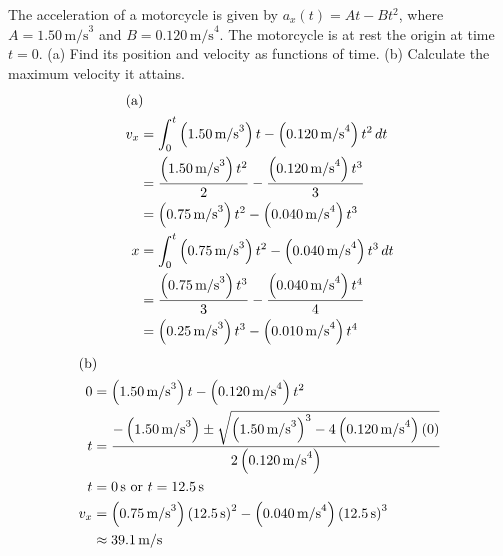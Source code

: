 \documentclass[12pt]{article}
\newenvironment{problem}[2][]{
    \begin{trivlist}
        \item[
            {\bfseries #1}
            {\bfseries #2}
        ]
}{\end{trivlist}}
\newcommand{\Part}[1]{\shortintertext{(#1)}}
\newcommand{\unit}[1]{\, \text{#1}}
\newcommand{\mps}{\unit{m/s}}
\newcommand{\s}{\unit{s}}
\begin{document}
\begin{problem}{2.53}
    The acceleration of a motorcycle is given by $a_x(t) = At - Bt^2$, where $A = 1.50 \mps^3$ and $B = 0.120 \mps^4$.
    The motorcycle is at rest the origin at time $t = 0$.
    (a) Find its position and velocity as functions of time.
    (b) Calculate the maximum velocity it attains.
    \begin{align}
        \Part{a}
        v_x &= \int_0^t \left(1.50 \mps^3\right)t - \left(0.120 \mps^4\right)t^2 \, dt \\
        &= \frac{\left(1.50 \mps^3\right)t^2}{2} - \frac{\left(0.120 \mps^4\right)t^3}{3} \\
        &= \left(0.75 \mps^3\right)t^2 - \left(0.040 \mps^4\right)t^3 \\
        x &= \int_0^t \left(0.75 \mps^3\right)t^2 - \left(0.040 \mps^4\right)t^3 \, dt \\
        &= \frac{\left(0.75 \mps^3\right)t^3}{3} - \frac{\left(0.040 \mps^4\right)t^4}{4} \\
        &= \left(0.25 \mps^3\right)t^3 - \left(0.010 \mps^4\right)t^4
    \end{align}
    \begin{align}
        \Part{b}
        0 &= \left(1.50 \mps^3\right)t - \left(0.120 \mps^4\right)t^2 \\
        t &= \frac{-\left(1.50 \mps^3\right) \pm \sqrt{\left(1.50 \mps^3\right)^3 - 4 \left(0.120 \mps^4\right) \left(0\right)}}{2 \left(0.120 \mps^4\right)} \\
        t &= 0 \s \text{ or } t = 12.5 \s \\
        v_x &= \left(0.75 \mps^3\right) \left(12.5 \s\right)^2 - \left(0.040 \mps^4\right) \left(12.5 \s\right)^3 \\
        &\approx 39.1 \mps
    \end{align}
\end{problem}
\end{document}

